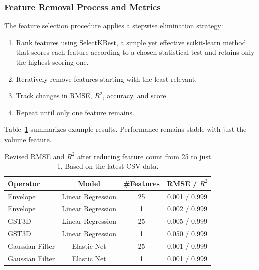 \subsubsection{Feature Removal Process and Metrics}
\label{subsec:feature-removal-methods-and-metrics}

The feature selection procedure applies a stepwise elimination strategy:

\begin{enumerate}
    \item Rank features using SelectKBest, a simple yet effective scikit-learn method~\cite{pedregosa2011scikit} that scores each feature according to a chosen statistical test and retains only the highest-scoring one.
    \item Iteratively remove features starting with the least relevant.
    \item Track changes in \ac{RMSE}, $R^2$, accuracy, and score.
    \item Repeat until only one feature remains.
\end{enumerate}

Table~\ref{tab:feature_selection_minimal_impact} summarizes example results.
Performance remains stable with just the volume feature.

\begin{table}[htbp]
    \centering
    \begin{tabular}{lccc}
        \hline
        \textbf{Operator} & \textbf{Model}    & \textbf{\#Features} & \textbf{\ac{RMSE} / $R^2$} \\
        \hline
        Envelope          & Linear Regression & 25                  & 0.001 / 0.999              \\
        Envelope          & Linear Regression & 1                   & 0.002 / 0.999              \\
        \ac{GST3D}        & Linear Regression & 25                  & 0.005 / 0.999              \\
        \ac{GST3D}        & Linear Regression & 1                   & 0.050 / 0.999              \\
        Gaussian Filter   & Elastic Net       & 25                  & 0.001 / 0.999              \\
        Gaussian Filter   & Elastic Net       & 1                   & 0.001 / 0.999              \\
        \hline
    \end{tabular}
    \caption{Revised \ac{RMSE} and $R^2$ after reducing feature count from 25 to just 1,
        Based on the latest \ac{CSV} data.
        \label{tab:feature_selection_minimal_impact}
    }
\end{table}

